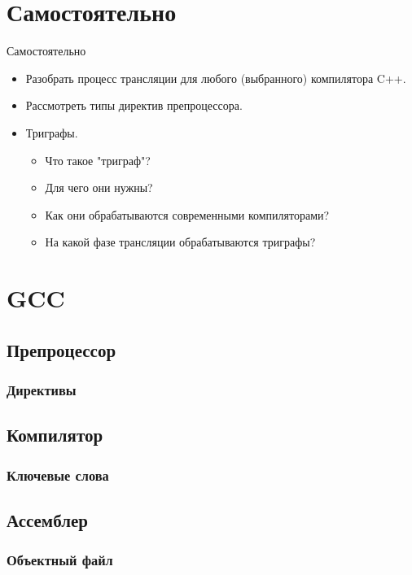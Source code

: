     \section{Самостоятельно}
    \begin{frame}{Самостоятельно}
        \begin{itemize}
            \item Разобрать процесс трансляции для любого (выбранного) компилятора C++.
            \item Рассмотреть типы директив препроцессора.
            \item Триграфы.
                \begin{itemize}
                    \item Что такое "триграф"?
                    \item Для чего они нужны?
                    \item Как они обрабатываются современными компиляторами?
                    \item На какой фазе трансляции обрабатываются триграфы?
                \end{itemize}
        \end{itemize}
    \end{frame}
    \section{GCC}
    \subsection{Препроцессор}
    \subsubsection{Директивы}
    \subsection{Компилятор}
    \subsubsection{Ключевые слова}
    \subsection{Ассемблер}
    \subsubsection{Объектный файл}
